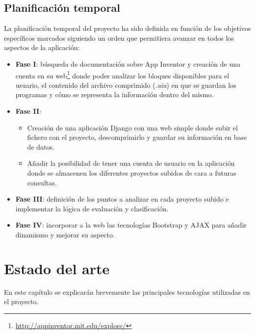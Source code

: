 \documentclass[a4paper, 12pt]{book}
\begin{document}
\section{Planificación temporal}
\label{sec:planificacion-temporal}
La planificación temporal del proyecto ha sido definida en función de los objetivos específicos marcados siguiendo un orden que permitiera avanzar en todos los aspectos de la aplicación:
\begin{itemize}
  \item \textbf{Fase I}: búsqueda de documentación sobre App Inventor y creación de una cuenta en su web\footnote{\url{http://appinventor.mit.edu/explore/}} donde poder analizar los bloques disponibles para el usuario, el contenido del archivo comprimido (\textit{.aia}) en que se guardan los programas y cómo se representa la información dentro del mismo. 

  \item \textbf{Fase II}: 
	\begin{itemize}
		\item Creación de una aplicación Django con una web simple donde subir el fichero con el proyecto, descomprimirlo y guardar su información en base de datos.
		\item Añadir la posibilidad de tener una cuenta de usuario en la aplicación donde se almacenen los diferentes proyectos subidos de cara a futuras consultas. 
	\end{itemize}
  \item \textbf{Fase III}: definición de los puntos a analizar en cada proyecto subido e implementar la lógica de evaluación y clasificación.
  
  
  \item \textbf{Fase IV}: incorporar a la web las tecnologías Bootstrap y AJAX para añadir dinamismo y mejorar su aspecto. 
\end{itemize}



\cleardoublepage
\chapter{Estado del arte}
En este capítulo se explicarán brevemente las principales tecnologías utilizadas en el proyecto.
\end{document}
